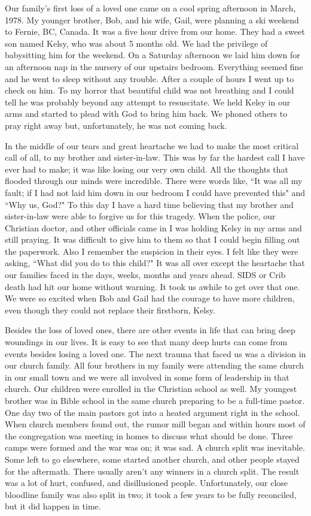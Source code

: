 \documentclass[oneside]{book}
\begin{document}
Our family's first loss of a loved one came on a cool spring afternoon in March, 1978. My  younger brother, Bob, and his wife, Gail, were planning a ski weekend to Fernie, BC, Canada. It was a five hour drive from our home. They had a sweet son named Kelsy, who was about 5 months old. We had the privilege of babysitting him for the weekend. On a Saturday afternoon we laid him down for an afternoon nap in the nursery of our upstairs bedroom. Everything seemed fine and he went to sleep without any trouble. After a couple of hours I went up to check on him. To my horror that beautiful child was not breathing and I could tell he was probably beyond any attempt to resuscitate. We held Kelsy in our arms and started to plead with God to bring him back. We phoned others to pray right away but, unfortunately, he was not coming back. 

In the middle of our tears and great heartache we had to make the most critical call of all, to my brother and sister-in-law. This was by far the hardest call I have ever had to make; it was like losing our very own child. All the thoughts that flooded through our minds were incredible. There were words like, ``It was all my fault; if I had not laid him down in our bedroom I could have prevented this" and ``Why us, God?" To this day I have a hard time believing that my brother and sister-in-law were able to forgive us for this tragedy. When the police, our Christian doctor, and other officials came in I was holding Kelsy in my arms and still praying. It was difficult to give him to them so that I could begin filling out the paperwork. Also I remember the suspicion in their eyes. I felt like they were asking, ``What did you do to this child?" It was all over except the heartache that our families faced in the days, weeks, months and years ahead. SIDS or Crib death had hit our home without warning. It took us awhile to get over that one. We were so excited when Bob and Gail had the courage to have more children, even though they could not replace their firstborn, Kelsy.

Besides the loss of loved ones, there are other events in life that can bring deep woundings in our lives. It is easy to see that many deep hurts can come from events besides losing a loved one. The next trauma that faced us was a division in our church family. All four brothers in my family were attending the same church in our small town and we were all involved in some form of leadership in that church. Our children were enrolled in the Christian school as well. My youngest brother was in Bible school in the same church preparing to be a full-time pastor. One day two of the main pastors got into a heated argument right in the school. When church members found out, the rumor mill began and within hours most of the congregation was meeting in homes to discuss what should be done. Three camps were formed and the war was on; it was sad. A church split was inevitable. Some left to go elsewhere, some started another church, and other people stayed for the aftermath. There usually aren't any winners in a church split. The result was a lot of hurt, confused, and disillusioned people. Unfortunately, our close bloodline family was also split in two; it took a few years to be fully reconciled, but it did happen in time. 
\end{document}
